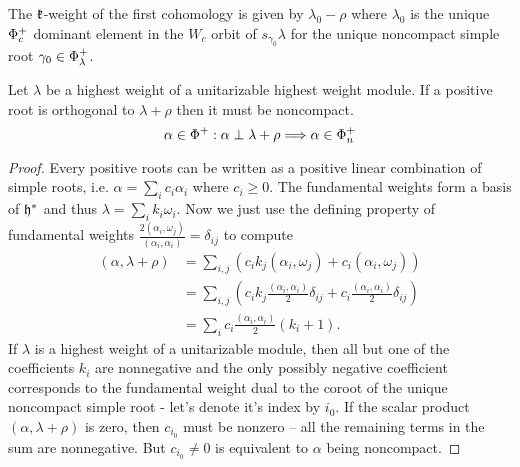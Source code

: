 \begin{remark}
 The $\mathfrak{k}$-weight of the first cohomology is given by $\lambda_0-\rho$ where $\lambda_0$ is the unique $\Phi_c^+$ dominant element in the $W_c$ orbit of $s_{\gamma_0}\lambda$ for the unique noncompact simple root $\gamma_0 \in \Phi_\lambda^+$.
\end{remark}

\begin{lemma}\label{lem:singular_are_noncompact}
 Let $\lambda$ be a highest weight of a unitarizable highest weight module. If a positive root is orthogonal to $\lambda + \rho$ then it must be noncompact.
 \[
  \alpha \in \Phi^+: \alpha \perp \lambda + \rho \Longrightarrow \alpha \in \Phi^+_n
 \]
\end{lemma}
\begin{proof}
 Every positive roots can be written as a positive linear combination of simple roots, i.e. $\alpha = \sum_i c_i \alpha_i$ where $c_i \geq 0$. The fundamental weights form a basis of $\mathfrak{h}^*$ and thus $\lambda = \sum_i k_i \omega_i$. Now we just use the defining property of fundamental weights $\frac{2(\alpha_i,\omega_j)}{(\alpha_i,\alpha_i)} = \delta_{ij}$ to compute
 \begin{align*}
  (\alpha,\lambda+\rho) & = \sum_{i,j} \left(  c_i k_j (\alpha_i,\omega_j) + c_i (\alpha_i,\omega_j) \right ) \\
			& = \sum_{i,j} \left( c_i k_j \frac{(\alpha_i,\alpha_i)}{2} \delta_{ij} + c_i \frac{(\alpha_i,\alpha_i)}{2} \delta_{ij} \right ) \\
			& = \sum_i c_i \frac{(\alpha_i,\alpha_i)}{2} (k_i + 1).
 \end{align*}
 If $\lambda$ is a highest weight of a unitarizable module, then all but one of the coefficients $k_i$ are nonnegative and the only possibly negative coefficient corresponds to the fundamental weight dual to the coroot of the unique noncompact simple root - let's denote it's index by $i_0$. If the scalar product $(\alpha, \lambda+\rho)$ is zero, then $c_{i_0}$ must be nonzero -- all the remaining terms in the sum are nonnegative. But $c_{i_0} \neq 0$ is equivalent to $\alpha$ being noncompact.
\end{proof}


